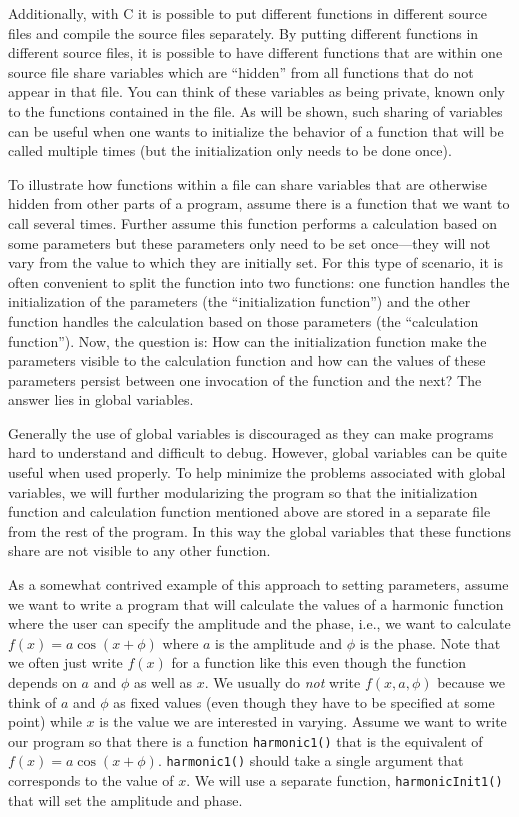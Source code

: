 Additionally, with C it is possible to put different functions in
different source files and compile the source files separately.  By
putting different functions in different source files, it is possible
to have different functions that are within one source file share
variables which are ``hidden'' from all functions that do not appear
in that file.  You can think of these variables as being private,
known only to the functions contained in the file.  As will be shown,
such sharing of variables can be useful when one wants to initialize
the behavior of a function that will be called multiple times (but the
initialization only needs to be done once).

To illustrate how functions within a file can share variables that are
otherwise hidden from other parts of a program, assume there is a
function that we want to call several times.  Further assume this
function performs a calculation based on some parameters but these
parameters only need to be set once---they will not vary from the
value to which they are initially set.  For this type of scenario, it
is often convenient to split the function into two functions: one
function handles the initialization of the parameters (the
``initialization function'') and the other function handles the
calculation based on those parameters (the ``calculation function'').
Now, the question is: How can the initialization function make the
parameters visible to the calculation function and how can the values
of these parameters persist between one invocation of the function and
the next?  The answer lies in global variables.

Generally the use of global variables is discouraged as they can make
programs hard to understand and difficult to debug.  However, global
variables can be quite useful when used properly.  To help minimize
the problems associated with global variables, we will further
modularizing the program so that the initialization function and
calculation function mentioned above are stored in a separate file
from the rest of the program.  In this way the global variables that
these functions share are not visible to any other function.

As a somewhat contrived example of this approach to setting
parameters, assume we want to write a program that will calculate the
values of a harmonic function where the user can specify the amplitude
and the phase, i.e., we want to calculate $f(x) = a\cos(x+\phi)$ where
$a$ is the amplitude and $\phi$ is the phase.  Note that we often just
write $f(x)$ for a function like this even though the function depends
on $a$ and $\phi$ as well as $x$.  We usually do {\em not} write
$f(x,a,\phi)$ because we think of $a$ and $\phi$ as fixed values (even
though they have to be specified at some point) while $x$ is the value
we are interested in varying.  Assume we want to write our program so
that there is a function {\tt harmonic1()} that is the equivalent of
$f(x) = a\cos(x+\phi)$.  {\tt harmonic1()} should take a single
argument that corresponds to the value of $x$.  We will use a separate
function, {\tt harmonicInit1()} that will set the amplitude and phase.

